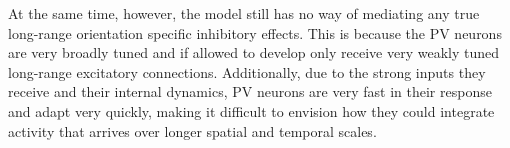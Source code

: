 At the same time, however, the model still has no way of mediating any
true long-range orientation specific inhibitory effects. This is
because the PV neurons are very broadly tuned and if allowed to
develop only receive very weakly tuned long-range excitatory
connections. Additionally, due to the strong inputs they receive and
their internal dynamics, PV neurons are very fast in their response
and adapt very quickly, making it difficult to envision how they could
integrate activity that arrives over longer spatial and temporal
scales.
